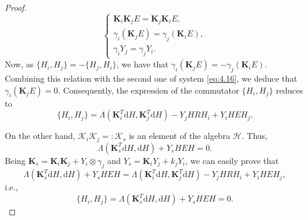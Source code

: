 \documentclass[10pt,a4paper]{amsart}
\newcommand{\bs}{\boldsymbol}
\newcommand{\rd}{\mathrm{d}}
\begin{document}
\begin{proof}
\begin{equation} \label{eq:4.16}
\left\lbrace \begin{array}{c}
\bs{K}_{i}\bs{K}_{j}E=\bs{K}_{j}\bs{K}_{i}E,\\
\gamma_{i}(\bs{K}_{j}E)=\gamma_{j}(\bs{K}_{i}E),\\
\gamma_{i}Y_{j}=\gamma_{j}Y_{i}.
\end{array} \right. 
\end{equation}
Now, as $\lbrace H_{i},H_{j}\rbrace=-\lbrace H_{j},H_{i}\rbrace$, we have that  $\gamma_{i}(\bs{K}_{j}E)=-\gamma_{j}(\bs{K}_{i}E)$. Combining this relation with the second one of system \eqref{eq:4.16}, we deduce that $\gamma_{i}(\bs{K}_{j}E)=0$. Consequently, the expression of the commutator $\lbrace H_{i},H_{j}\rbrace$ reduces to
\begin{equation}
\lbrace H_{i},H_{j}\rbrace=\Lambda(\bs{K}_{i}^{T}\rd H,\bs{K}_{j}^{T}\rd H)-Y_{j}HRH_{i}+Y_{i}HEH_{j}.
\end{equation}

On the other hand, $\bs{\mathcal{K}}_{i}\bs{\mathcal{K}}_{j}=: \bs{\mathcal{K}}_{s}$ is an element of the algebra $\mathscr{H}$. Thus,
\begin{equation}
\Lambda(\bs{K}_{s}^{T}\rd H,\rd H)+Y_{s}HEH=0.
\end{equation}
Being $\bs{K}_{s}=\bs{K}_{i}\bs{K}_{j}+Y_{i}\otimes\gamma_{j}$ and $Y_{s}=\bs{K}_{i}Y_{j}+k_{j}Y_{i}$, we can easily prove that
\begin{equation}
\Lambda(\bs{K}_{s}^{T}\rd H,\rd H)+Y_{s}HEH=\Lambda(\bs{K}_{i}^{T}\rd H,\bs{K}_{j}^{T}\rd H)-Y_{j}HRH_{i}+Y_{i}HEH_{j},
\end{equation}
i.e.,
\begin{equation}
\lbrace H_{i},H_{j}\rbrace=\Lambda(\bs{K}_{s}^{T}\rd H,\rd H)+Y_{s}HEH=0.
\end{equation}
\end{proof}
\end{document}
